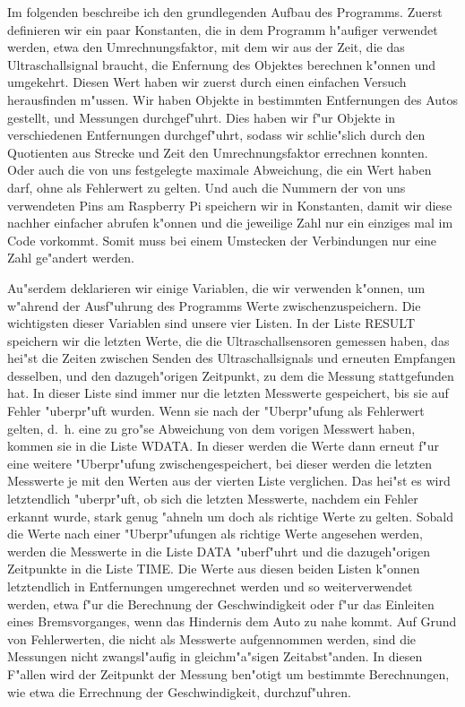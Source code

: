 \documentclass[a4paper,12pt]{article}
\begin{document}
\medskip

Im folgenden beschreibe ich den grundlegenden Aufbau des Programms.
Zuerst definieren wir ein paar Konstanten, die in dem Programm h"aufiger verwendet werden, etwa den Umrechnungsfaktor, mit dem wir aus der Zeit, die das Ultraschallsignal braucht, die Enfernung des Objektes berechnen k"onnen und umgekehrt.
Diesen Wert haben wir zuerst durch einen einfachen Versuch herausfinden m"ussen.
Wir haben Objekte in bestimmten Entfernungen des Autos gestellt, und Messungen durchgef"uhrt.
Dies haben wir f"ur Objekte in verschiedenen Entfernungen durchgef"uhrt, sodass wir schlie"slich durch den Quotienten aus Strecke und Zeit den Umrechnungsfaktor errechnen konnten.
Oder auch die von uns festgelegte maximale Abweichung, die ein Wert haben darf, ohne als Fehlerwert zu gelten.
Und auch die Nummern der von uns verwendeten Pins am Raspberry Pi speichern wir in Konstanten, damit wir diese nachher einfacher abrufen k"onnen und die jeweilige Zahl nur ein einziges mal im Code vorkommt.
Somit muss bei einem Umstecken der Verbindungen nur eine Zahl ge"andert werden.

Au"serdem deklarieren wir einige Variablen, die wir verwenden k"onnen, um w"ahrend der Ausf"uhrung des Programms Werte zwischenzuspeichern.
Die wichtigsten dieser Variablen sind unsere vier Listen.
In der Liste RESULT speichern wir die letzten Werte, die die Ultraschallsensoren gemessen haben, das hei"st die Zeiten zwischen Senden des Ultraschallsignals und erneuten Empfangen desselben, und den dazugeh"origen Zeitpunkt, zu dem die Messung stattgefunden hat.
In dieser Liste sind immer nur die letzten Messwerte gespeichert, bis sie auf Fehler "uberpr"uft wurden.
Wenn sie nach der "Uberpr"ufung als Fehlerwert gelten, d.~h. eine zu gro"se Abweichung von dem vorigen Messwert haben, kommen sie in die Liste WDATA.
In dieser werden die Werte dann erneut f"ur eine weitere "Uberpr"ufung zwischengespeichert, bei dieser werden die letzten Messwerte je mit den Werten aus der vierten Liste verglichen.
Das hei"st es wird letztendlich "uberpr"uft, ob sich die letzten Messwerte, nachdem ein Fehler erkannt wurde, stark genug "ahneln um doch als richtige Werte zu gelten.
Sobald die Werte nach einer "Uberpr"ufungen als richtige Werte angesehen werden, werden die Messwerte in die Liste DATA "uberf"uhrt und die dazugeh"origen Zeitpunkte in die Liste TIME.
Die Werte aus diesen beiden Listen k"onnen letztendlich in Entfernungen umgerechnet werden und so weiterverwendet werden, etwa f"ur die Berechnung der Geschwindigkeit oder f"ur das Einleiten eines Bremsvorganges, wenn das Hindernis dem Auto zu nahe kommt.
Auf Grund von Fehlerwerten, die nicht als Messwerte aufgennommen werden, sind die Messungen nicht zwangsl"aufig in gleichm"a"sigen Zeitabst"anden.
In diesen F"allen wird der Zeitpunkt der Messung ben"otigt um bestimmte Berechnungen, wie etwa die Errechnung der Geschwindigkeit, durchzuf"uhren.
\end{document}
